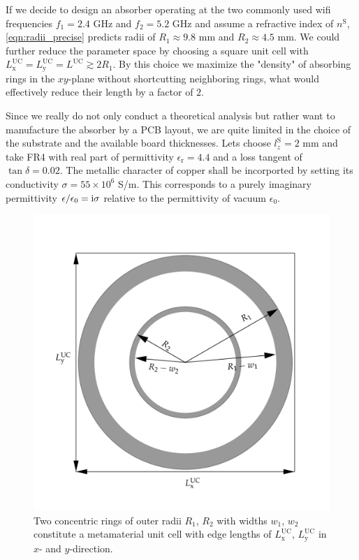 If we decide to design an absorber operating at the two commonly used wifi frequencies $f_1=2.4$ GHz and $f_2=5.2$ GHz and assume a refractive index of $n^\mathrm{S}$, \cref{eqn:radii_precise} predicts radii of $R_1\approx9.8$ mm and $R_2\approx 4.5$ mm. We could further reduce the parameter space by choosing a square unit cell with $L^\mathrm{UC}_\mathrm{x}=L^\mathrm{UC}_\mathrm{y}=L^\mathrm{UC}\gtrsim 2R_1$. By this choice we maximize the "density" of absorbing rings in the $xy$-plane without shortcutting neighboring rings, what would effectively reduce their length by a factor of $2$.

Since we really do not only conduct a theoretical analysis but rather want to manufacture the absorber by a PCB layout, we are quite limited in the choice of the substrate and the available board thicknesses. Lets choose $l_z^\mathrm{S}=2$ mm and take FR4 with real part of permittivity $\epsilon_\mathrm{r}=4.4$ and a loss tangent of $\tan \delta=0.02$. The metallic character of copper shall be incorported by setting its conductivity $\sigma=55\times 10^6$ S/m. This corresponds to a purely imaginary permittivity $\epsilon/\epsilon_0 = \mathrm{i} \sigma$ relative to the permittivity of vacuum $\epsilon_0$.

\begin{figure}
\centering
\includegraphics[width=0.75\linewidth]{./media/double_ring_sketch.pdf}
\caption{Two concentric rings of outer radii $R_1$, $R_2$ with widths $w_1$, $w_2$ constitute a metamaterial unit cell with edge lengths of $L_\mathrm{x}^\mathrm{UC}$, $L_\mathrm{y}^\mathrm{UC}$ in $x$- and $y$-direction.}
\label{fig:double_ring_sketch}
\end{figure}

